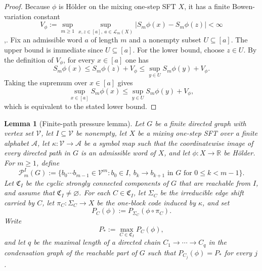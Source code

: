 \documentclass{etds}%
\numberwithin{equation}{section}
\theoremstyle{plain}
\newtheorem{lemma}[theorem]{Lemma}
\theoremstyle{definition}
\theoremstyle{remark}
\begin{document}
\begin{proof}
Because $\phi$ is H\"older on the mixing one-step SFT $X$, it has a finite
Bowen-variation constant
\[
V_\phi:=\sup_{m\ge 1}\sup_{x,z\in[a],\ a\in\mathcal{L}_m(X)}
|S_m\phi(x)-S_m\phi(z)|<\infty
\]
\cite[Ch.~1]{Bowen1975},\cite[Ch.~9]{WaltersErgodicTheory}.  Fix an admissible
word $a$ of length $m$ and a nonempty subset $U\subseteq[a]$.  The upper bound
is immediate since $U\subseteq[a]$.  For the lower bound, choose $z\in U$.  By
the definition of $V_\phi$, for every $x\in[a]$ one has
\[
S_m\phi(x)\le S_m\phi(z)+V_\phi\le \sup_{y\in U}S_m\phi(y)+V_\phi.
\]
Taking the supremum over $x\in[a]$ gives
\[
\sup_{x\in[a]}S_m\phi(x)\le \sup_{y\in U}S_m\phi(y)+V_\phi,
\]
which is equivalent to the stated lower bound.
\end{proof}

\begin{lemma}[Finite-path pressure lemma]
\label{lem:finite-path-pressure}
Let $G$ be a finite directed graph with vertex set $\mathcal{V}$, let
$I\subseteq\mathcal{V}$ be nonempty, let $X$ be a mixing one-step SFT over a
finite alphabet $\mathcal{A}$, let $\kappa:\mathcal{V}\to\mathcal{A}$ be a
symbol map such that the coordinatewise image of every directed path in $G$ is
an admissible word of $X$, and let $\phi:X\to\mathbb{R}$ be H\"older.  For
$m\ge 1$, define
\[
\mathcal{P}_m^I(G)
:=\{b_0\cdots b_{m-1}\in\mathcal{V}^m:
b_0\in I,\ b_k\to b_{k+1}\text{ in }G\text{ for }0\le k<m-1\}.
\]
Let $\mathfrak{C}_I$ be the cyclic strongly connected components of $G$ that
are reachable from $I$, and assume that $\mathfrak{C}_I\neq\varnothing$.  For
each $C\in\mathfrak{C}_I$, let $\Sigma_C$ be the irreducible edge shift
carried by $C$, let $\pi_C:\Sigma_C\to X$ be the one-block code induced by
$\kappa$, and set
\[
P_C(\phi):=P_{\Sigma_C}(\phi\circ\pi_C).
\]
Write
\[
P_*:=\max_{C\in\mathfrak{C}_I}P_C(\phi),
\]
and let $q$ be the maximal length of a directed chain
$C_1\to\cdots\to C_q$ in the condensation graph of the reachable part of $G$
such that $P_{C_j}(\phi)=P_*$ for every $j$.


\end{lemma}
\end{document}
